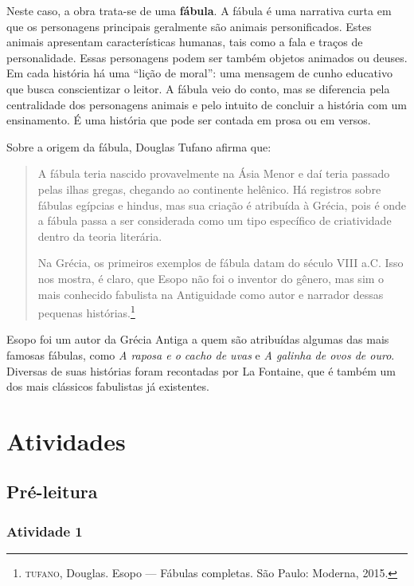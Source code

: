 \documentclass[11pt]{extarticle}
\begin{document}
Neste caso, a obra trata-se de uma \textbf{fábula}. A fábula é uma narrativa curta em que os personagens principais geralmente são animais personificados.  Estes animais apresentam características humanas, tais como a fala e traços de personalidade. Essas personagens podem ser também objetos animados ou deuses. Em cada história há uma ``lição de moral'': uma mensagem de cunho educativo que busca conscientizar o leitor. A fábula veio do conto, mas se diferencia pela centralidade dos personagens animais e pelo intuito de concluir a história com um ensinamento. É uma história que pode ser contada em prosa ou em versos. 

Sobre a origem da fábula, Douglas Tufano afirma que:

\begin{quote} A fábula teria nascido provavelmente na Ásia Menor e daí teria passado pelas ilhas gregas, chegando ao continente helênico. Há registros sobre fábulas egípcias e hindus, mas sua criação é atribuída à Grécia, pois é onde a fábula passa a ser considerada como um tipo específico de criatividade dentro da teoria literária. 

Na Grécia, os primeiros exemplos de fábula datam do século VIII a.C. Isso nos mostra, é claro, que Esopo não foi o inventor do gênero, mas sim o mais conhecido fabulista na Antiguidade como autor e narrador dessas pequenas histórias.\footnote{\textsc{tufano}, Douglas. Esopo --- Fábulas completas. São Paulo: Moderna, 2015.}\end{quote}

Esopo foi um autor da Grécia Antiga a quem são atribuídas algumas das mais famosas fábulas, como \textit{A raposa e o cacho de uvas} e \textit{A galinha de ovos de ouro}. Diversas de suas histórias foram recontadas por La Fontaine, que é também um dos mais clássicos fabulistas já existentes. 

\section{Atividades}

\subsection{Pré-leitura}

\subsubsection{Atividade 1}
\end{document}

